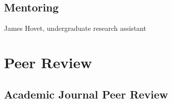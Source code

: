 \documentclass[11pt,letterpaper]{report} %
\newcommand{\listitemspace}{0.25em}
\renewenvironment{itemize}
{\begin{list}{}{\setlength{\leftmargin}{0em}
                \setlength{\parskip}{0em}
                \setlength{\itemsep}{\listitemspace}
                \setlength{\parsep}{\listitemspace}}}
{\end{list}}
\begin{document}
%
%

    \subsection*{Mentoring}

    \begin{itemize}

        \item James Hovet, undergraduate research assistant

    \end{itemize}



    \section*{Peer Review}

    \subsection*{Academic Journal Peer Review}
\end{document}
